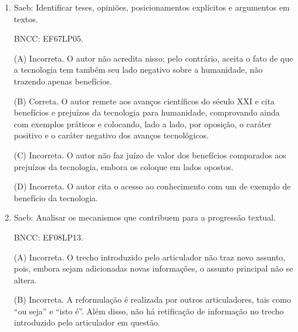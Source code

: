 \begin{enumerate}
(C) Incorreta. O que auxilia na compreensão das ações narradas é o
trecho introduzido pela expressão ``pouco antes desse evento'', que não
faz parte da frase inicial da narrativa. Além disso, a frase inicial não
auxilia na compreensão das ações seguintes, pois ela é que precisa do
apoio do restante da narrativa para ser entendida.

(D) Correta. O leitor é ``jogado'' num ponto adiantado da história e se
depara com a narração de uma cena posterior à situação inicial, mas
ainda não sabe disso, pois até então aquela parece ser uma cena
qualquer. No decorrer da leitura, essa cena ganha importância
diferenciada na narrativa, porque o leitor descobre que a ação da
personagem, narrada no início, é algo proibido.

\item


Saeb: Identificar teses, opiniões, posicionamentos explícitos e
argumentos em textos.

BNCC: EF67LP05.

(A) Incorreta. O autor não acredita nisso; pelo contrário, aceita o fato
de que a tecnologia tem também seu lado negativo sobre a humanidade, não
trazendo apenas benefícios.

(B) Correta. O autor remete aos avanços científicos do século XXI e cita
benefícios e prejuízos da tecnologia para humanidade, comprovando ainda
com exemplos práticos e colocando, lado a lado, por oposição, o caráter
positivo e o caráter negativo dos avanços tecnológicos.

(C) Incorreta. O autor não faz juízo de valor dos benefícios comparados
aos prejuízos da tecnologia, embora os coloque em lados opostos.

(D) Incorreta. O autor cita o acesso ao conhecimento com um de exemplo
de benefício da tecnologia.

\item

Saeb: Analisar os mecanismos que contribuem para a progressão textual.

BNCC: EF08LP13.

(A) Incorreta. O trecho introduzido pelo articulador não traz novo
assunto, pois, embora sejam adicionadas novas informações, o assunto
principal não se altera.

(B) Incorreta. A reformulação é realizada por outros articuladores, tais
como ``ou seja'' e ``isto é''. Além disso, não há retificação de
informação no trecho introduzido pelo articulador em questão.


\end{enumerate}
